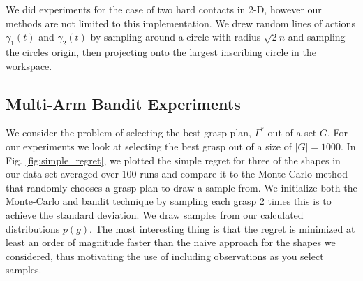 \documentclass[letterpaper, 10 pt, conference]{ieeeconf}  %
\begin{document}
We did experiments for the case of two hard contacts in 2-D, however our methods are not limited to this implementation. We drew random lines of actions $\gamma_1(t)$ and $\gamma_2(t)$ by sampling around a circle with radius $\sqrt{2}n$ and sampling the circles origin, then projecting onto the largest inscribing circle in the workspace. 





\subsection{Multi-Arm Bandit Experiments}

We consider the problem of selecting the best grasp plan, $\Gamma^*$ out of a set $G$. For our experiments we look at selecting the best grasp out of a size of $|G| = 1000$. In Fig. \ref{fig:simple_regret}, we plotted the simple regret for three of the shapes in our data set averaged over 100 runs and compare it to the Monte-Carlo method that randomly chooses a grasp plan to draw a sample from. We initialize both the Monte-Carlo and bandit technique by sampling each grasp 2 times this is to achieve the standard deviation. We draw samples from our calculated distributions $p(g)$.  The most interesting thing is that the regret is minimized at least an order of magnitude faster than the naive approach for the shapes we considered, thus motivating the use of including observations as you select samples. 
\end{document}
